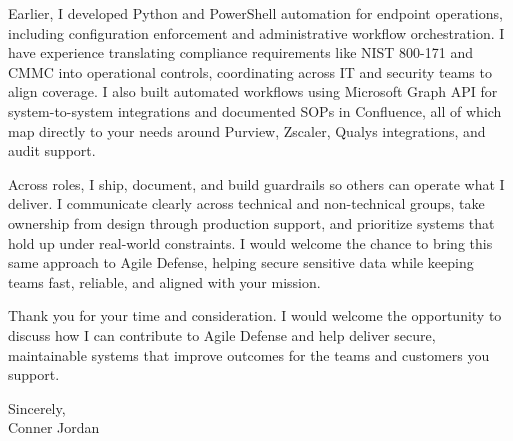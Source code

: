 \documentclass[letterpaper,11pt]{article}
\begin{document}
\vspace{16pt}

Earlier, I developed Python and PowerShell automation for endpoint operations, including configuration enforcement and administrative workflow orchestration. I have experience translating compliance requirements like NIST 800-171 and CMMC into operational controls, coordinating across IT and security teams to align coverage. I also built automated workflows using Microsoft Graph API for system-to-system integrations and documented SOPs in Confluence, all of which map directly to your needs around Purview, Zscaler, Qualys integrations, and audit support.

\vspace{16pt}

Across roles, I ship, document, and build guardrails so others can operate what I deliver. I communicate clearly across technical and non-technical groups, take ownership from design through production support, and prioritize systems that hold up under real-world constraints. I would welcome the chance to bring this same approach to Agile Defense, helping secure sensitive data while keeping teams fast, reliable, and aligned with your mission.

\vspace{16pt}

Thank you for your time and consideration. I would welcome the opportunity to discuss how I can contribute to Agile Defense and help deliver secure, maintainable systems that improve outcomes for the teams and customers you support.

\vspace{16pt}

Sincerely,\\
Conner Jordan
\end{document}
